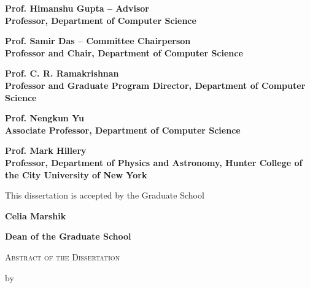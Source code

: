 \documentclass[
11pt, %
oneside, %
english, %
singlespacing, %
liststotoc, %
headsepline, %
]{MastersDoctoralThesis} %
\begin{document}
\begin{titlepage}
\begin{center}
    \noindent \textbf{Prof. Himanshu Gupta -- Advisor} \\
    \noindent \textbf{Professor, Department of Computer Science}
    \vspace{0.75cm}
     
    \noindent \textbf{Prof. Samir Das  -- Committee Chairperson}\\
    \noindent \textbf{Professor and Chair, Department of Computer Science}
    
    \vspace{0.75cm}
    
    \noindent \textbf{Prof. C. R. Ramakrishnan}\\
    \noindent \textbf{Professor and Graduate Program Director, Department of Computer Science}
    
    \vspace{0.75cm}
    
    \noindent \textbf{Prof. Nengkun Yu} \\
    \noindent \textbf{Associate Professor, Department of Computer Science}
    
    \vspace{0.75cm}

    \noindent \textbf{Prof. Mark Hillery} \\
    \noindent \textbf{Professor, Department of Physics and Astronomy, Hunter College of the City University of New York}
    
    \vspace{0.75cm}
    
    \noindent This dissertation is accepted by the Graduate School
    
    \vspace{0.75cm}
    
    \noindent \textbf{Celia Marshik}
    
    \noindent \textbf{Dean of the Graduate School}
    \vspace{0.5cm}
    
    \noindent \eject 
    

    \noindent \textsc{Abstract of the Dissertation}
    
    \vspace{0.25cm}
    
    \noindent by
    
    \vspace{0.25cm}
    
    \noindent \textsc{\textbf{\authorname}}
    

\end{center}
\end{titlepage}
\end{document}
